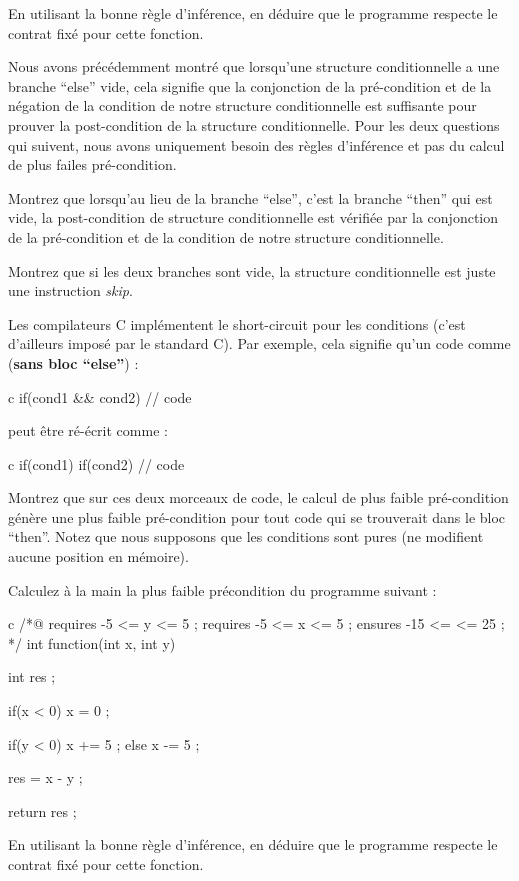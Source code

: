 En utilisant la bonne règle d'inférence, en déduire que le programme respecte le 
contrat fixé pour cette fonction.




Nous avons précédemment montré que lorsqu'une structure conditionnelle a une branche
``else'' vide, cela signifie que la conjonction de la pré-condition et de la négation
de la condition de notre structure conditionnelle est suffisante pour prouver la
post-condition de la structure conditionnelle.
Pour les deux questions qui suivent, nous avons uniquement besoin des règles d'inférence
et pas du calcul de plus failes pré-condition.


Montrez que lorsqu'au lieu de la branche ``else'', c'est la branche ``then'' qui est
vide, la post-condition de structure conditionnelle est vérifiée par la conjonction de
la pré-condition et de la condition de notre structure conditionnelle.


Montrez que si les deux branches sont vide, la structure conditionnelle est juste une
instruction \textit{skip}.




Les compilateurs C implémentent le short-circuit pour les conditions (c'est d'ailleurs
imposé par le standard C). Par exemple, cela signifie qu'un code comme (\textbf{sans
bloc ``else''}) :


\begin{CodeBlock}{c}
if(cond1 && cond2){
  // code
}
\end{CodeBlock}


peut être ré-écrit comme :


\begin{CodeBlock}{c}
if(cond1){
  if(cond2){    
    // code
  }
}
\end{CodeBlock}


Montrez que sur ces deux morceaux de code, le calcul de plus faible pré-condition
génère une plus faible pré-condition pour tout code qui se trouverait dans le bloc
``then''. Notez que nous supposons que les conditions sont pures (ne modifient aucune
position en mémoire).





Calculez à la main la plus faible précondition du programme suivant :


\begin{CodeBlock}{c}
/*@ 
  requires -5 <= y <= 5 ; 
  requires -5 <= x <= 5 ; 
  ensures  -15 <= \result <= 25 ;
*/
int function(int x, int y){
  int res ;

  if(x < 0){
    x = 0 ;
  }
  
  if(y < 0){
    x += 5 ;
  } else {
    x -= 5 ;
  }
  
  res = x - y ;

  return res ;
}
\end{CodeBlock}



En utilisant la bonne règle d'inférence, en déduire que le programme respecte le 
contrat fixé pour cette fonction.